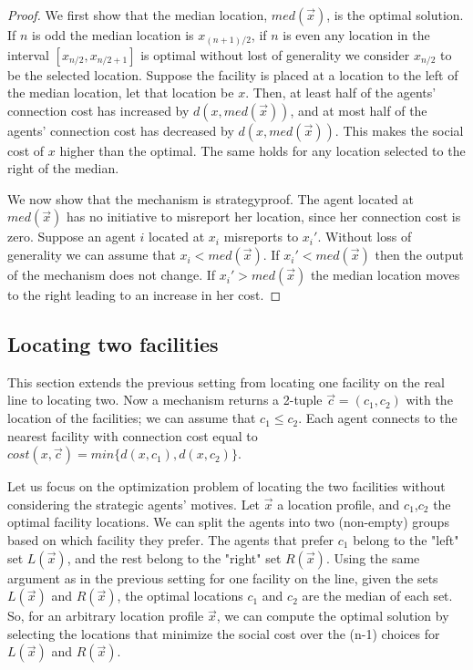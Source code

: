 \begin{proof}
We first show that the median location, $med(\vec{x})$, is the optimal solution. If $n$ is odd the median location is $x_{(n+1)/2}$, if $n$ is even any location in the interval $[x_{n/2},x_{n/2+1}]$ is optimal without lost of generality we consider $x_{n/2}$ to be the selected location. Suppose the facility is placed at a location to the left of the median location, let that location be $x$. Then, at least half of the agents' connection cost has increased by $d(x,med(\vec{x}))$, and at most half of the agents' connection cost has decreased by $d(x,med(\vec{x}))$. This makes the social cost of $x$ higher than the optimal. The same holds for any location selected to the right of the median.

We now show that the mechanism is strategyproof. The agent located at $med(\vec{x})$ has no initiative to misreport her location, since her connection cost is zero. Suppose an agent $i$ located at $x_i$ misreports to $x_i'$. Without loss of generality we can assume that $x_i<med(\vec{x})$. If $x_i'<med(\vec{x})$ then the output of the mechanism does not change. If $x_i'>med(\vec{x})$ the median location moves to the right leading to an increase in her cost.
\end{proof}




\subsection{Locating two facilities}
This section extends the previous setting from locating one facility on the real line to locating two. Now a mechanism returns a 2-tuple $\vec{c}=(c_1,c_2)$ with the location of the facilities; we can assume that $c_1 \le c_2$. Each agent connects to the nearest facility with connection cost equal to $cost(x,\vec{c})=min\{ d(x,c_1), d(x,c_2)\}$. 


Let us focus on the optimization problem of locating the two facilities without considering the strategic agents' motives. Let $\vec{x}$ a location profile, and $c_1$,$c_2$ the optimal facility locations.  We can split the agents into two (non-empty) groups based on which facility they prefer. The agents that prefer $c_1$ belong to the "left" set $L(\vec{x})$, and the rest belong to the "right" set $R(\vec{x})$. Using the same argument as in the previous setting for one facility on the line, given the sets $L(\vec{x})$ and $R(\vec{x})$, the optimal locations $c_1$ and $c_2$ are the median of each set. So, for an arbitrary location profile $\vec{x}$, we can compute the optimal solution by selecting the locations that minimize the social cost over the (n-1) choices for $L(\vec{x})$ and $R(\vec{x})$.

